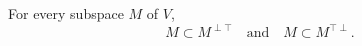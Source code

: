 For every subspace $M$ of $V$,
$$M \subset M^{\perp \top} \quad \text{and} \quad M \subset M^{\top \perp}.$$
